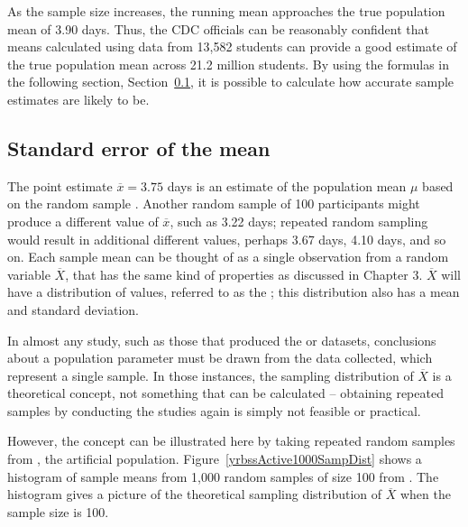 \begin{spacing}{1.5}
As the sample size increases, the running mean approaches the true population mean of 3.90 days. Thus, the CDC officials can be reasonably confident that means calculated using data from 13,582 students can provide a good estimate of the true population mean across 21.2 million students. By using the formulas in the following section, Section~\ref{seOfTheMean}, it is possible to calculate how accurate sample estimates are likely to be.

\subsection{Standard error of the mean}
\label{seOfTheMean}

The point estimate $\overline{x} = 3.75$ days is an estimate of the population mean $\mu$ based on the random sample . Another random sample of 100 participants might produce a different value of $\overline{x}$, such as 3.22 days; repeated random sampling would result in additional different values, perhaps 3.67 days, 4.10 days, and so on. Each sample mean can be thought of as a single observation from a random variable $\overline{X}$, that has the same kind of properties as discussed in Chapter 3. $\overline{X}$ will have a distribution of values, referred to as the ; this distribution also has a mean and standard deviation.

In almost any study, such as those that produced the  or  datasets, conclusions about a population parameter must be drawn from the data collected, which represent a single sample. In those instances, the sampling distribution of $\overline{X}$ is a theoretical concept, not something that can be calculated -- obtaining repeated samples by conducting the studies again is simply not feasible or practical.

However, the concept can be illustrated here by taking repeated random samples from , the artificial population. Figure~\ref{yrbssActive1000SampDist} shows a histogram of sample means from 1,000 random samples of size 100 from . The histogram gives a picture of the theoretical sampling distribution of $\overline{X}$ when the sample size is 100. 


\end{spacing}
